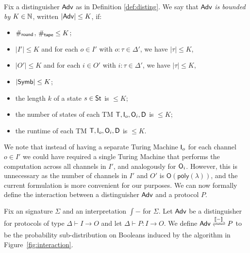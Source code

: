 \begin{definition}
Fix a distinguisher $\mathsf{Adv}$ as in Definition \ref{def:disting}. We say that $\mathsf{Adv}$ \emph{is bounded by} $K \in \mathbb{N}$, written $|\mathsf{Adv}| \leq K$, if:
\begin{itemize}
\item $\#_{\mathsf{round}}$, $\#_{\mathsf{tape}} \leq K$;
\item $|I'| \leq K$ and for each $o \in I'$ with $o : \tau \in \Delta'$, we have $|\tau| \leq K$,
\item $|O'| \leq K$ and for each $i \in O'$ with $i : \tau \in \Delta'$, we have $|\tau| \leq K$,
\item $|\mathsf{Symb}| \leq K$;
\item the length $k$ of a state $s \in \mathsf{St}$ is $\leq K$;
\item the number of states of each TM $\mathsf{T}, \mathsf{I}_o, \mathsf{O}_i, \mathsf{D}$ is $\leq K$;
\item the runtime of each TM $\mathsf{T}, \mathsf{I}_o, \mathsf{O}_i, \mathsf{D}$ is $\leq K$.
\end{itemize}
\end{definition}

\noindent We note that instead of having a separate Turing Machine $\mathsf{I}_o$ for each channel $o \in I'$ we could have required a single Turing Machine that performs the computation across all channels in $I'$, and analogously for $\mathsf{O}_i$. However, this is unnecessary as the number of channels in $I'$ and $O'$ is $\mathsf{O(poly(\lambda))}$, and the current formulation is more convenient for our purposes. We can now formally define the interaction between a distinguisher $\mathsf{Adv}$ and a protocol $P$.

\begin{definition}[Interaction]
Fix an \ipdl signature $\Sigma$ and an interpretation $\int{-}$ for $\Sigma$. Let $\mathsf{Adv}$ be a distinguisher for protocols of type $\Delta \vdash I \to O$ and let $\Delta \vdash P : I \to O$. We define $\interaction{\Adv}{P}{\int{-}}$ to be the probability sub-distribution on Booleans induced by the algorithm in Figure~\ref{fig:interaction}.
\end{definition}

